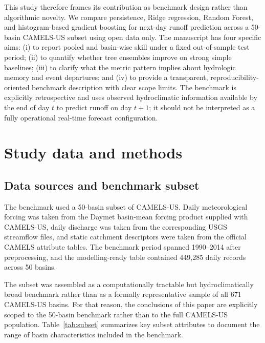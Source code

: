 \documentclass[preprint,12pt,authoryear]{elsarticle}
\begin{document}
This study therefore frames its contribution as benchmark design rather than algorithmic novelty. We compare persistence, Ridge regression, Random Forest, and histogram-based gradient boosting for next-day runoff prediction across a 50-basin CAMELS-US subset using open data only. The manuscript has four specific aims: (i) to report pooled and basin-wise skill under a fixed out-of-sample test period; (ii) to quantify whether tree ensembles improve on strong simple baselines; (iii) to clarify what the metric pattern implies about hydrologic memory and event departures; and (iv) to provide a transparent, reproducibility-oriented benchmark description with clear scope limits. The benchmark is explicitly retrospective and uses observed hydroclimatic information available by the end of day $t$ to predict runoff on day $t+1$; it should not be interpreted as a fully operational real-time forecast configuration.

\section{Study data and methods}

\subsection{Data sources and benchmark subset}

The benchmark used a 50-basin subset of CAMELS-US. Daily meteorological forcing was taken from the Daymet basin-mean forcing product supplied with CAMELS-US, daily discharge was taken from the corresponding USGS streamflow files, and static catchment descriptors were taken from the official CAMELS attribute tables. The benchmark period spanned 1990--2014 after preprocessing, and the modelling-ready table contained 449,285 daily records across 50 basins.

The subset was assembled as a computationally tractable but hydroclimatically broad benchmark rather than as a formally representative sample of all 671 CAMELS-US basins. For that reason, the conclusions of this paper are explicitly scoped to the 50-basin benchmark rather than to the full CAMELS-US population. Table~\ref{tab:subset} summarizes key subset attributes to document the range of basin characteristics included in the benchmark.
\end{document}
